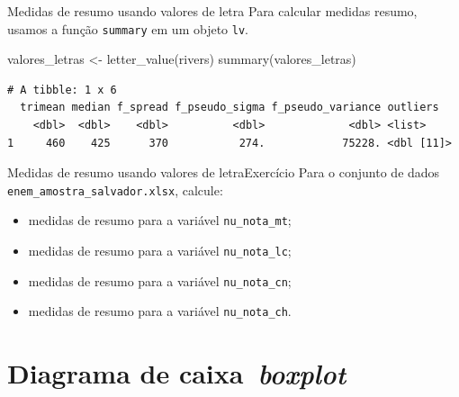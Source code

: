 \documentclass[
  10pt,
  ignorenonframetext,
]{beamer}
\newenvironment{Shaded}{\begin{snugshade}}{\end{snugshade}}
\newcommand{\FunctionTok}[1]{\textcolor[rgb]{0.28,0.35,0.67}{#1}}
\newcommand{\NormalTok}[1]{\textcolor[rgb]{0.00,0.23,0.31}{#1}}
\newcommand{\OtherTok}[1]{\textcolor[rgb]{0.00,0.23,0.31}{#1}}
\providecommand{\tightlist}{%
  \setlength{\itemsep}{0pt}\setlength{\parskip}{0pt}}\usepackage{longtable,booktabs,array}
\begin{document}
\begin{frame}[fragile]{Medidas de resumo usando valores de letra}
\protect\hypertarget{medidas-de-resumo-usando-valores-de-letra-1}{}
Para calcular medidas resumo, usamos a função \texttt{summary} em um
objeto \texttt{lv}.

\small

\begin{Shaded}
\begin{Highlighting}[]
\NormalTok{valores\_letras }\OtherTok{\textless{}{-}} \FunctionTok{letter\_value}\NormalTok{(rivers)}
\FunctionTok{summary}\NormalTok{(valores\_letras)}
\end{Highlighting}
\end{Shaded}

\begin{verbatim}
# A tibble: 1 x 6
  trimean median f_spread f_pseudo_sigma f_pseudo_variance outliers  
    <dbl>  <dbl>    <dbl>          <dbl>             <dbl> <list>    
1     460    425      370           274.            75228. <dbl [11]>
\end{verbatim}

\normalsize
\end{frame}

\begin{frame}[fragile]{Medidas de resumo usando valores de
letra\newline Exercício}
\protect\hypertarget{medidas-de-resumo-usando-valores-de-letraexercuxedcio}{}
Para o conjunto de dados \texttt{enem\_amostra\_salvador.xlsx}, calcule:

\begin{itemize}
\tightlist
\item
  medidas de resumo para a variável \texttt{nu\_nota\_mt};
\item
  medidas de resumo para a variável \texttt{nu\_nota\_lc};
\item
  medidas de resumo para a variável \texttt{nu\_nota\_cn};
\item
  medidas de resumo para a variável \texttt{nu\_nota\_ch}.
\end{itemize}
\end{frame}

\hypertarget{diagrama-de-caixa-boxplot}{%
\section{\texorpdfstring{Diagrama de
caixa\newline\newline~\emph{boxplot}}{Diagrama de caixa~boxplot}}\label{diagrama-de-caixa-boxplot}}
\end{document}
